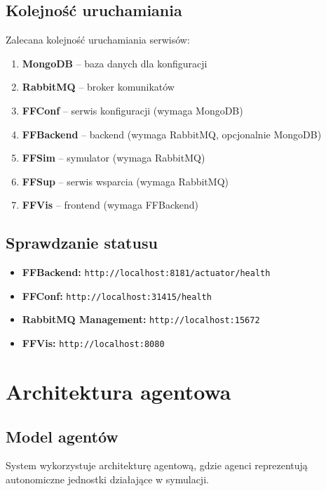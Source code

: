 \subsection{Kolejność uruchamiania}

Zalecana kolejność uruchamiania serwisów:

\begin{enumerate}
    \item \textbf{MongoDB} -- baza danych dla konfiguracji
    \item \textbf{RabbitMQ} -- broker komunikatów
    \item \textbf{FFConf} -- serwis konfiguracji (wymaga MongoDB)
    \item \textbf{FFBackend} -- backend (wymaga RabbitMQ, opcjonalnie MongoDB)
    \item \textbf{FFSim} -- symulator (wymaga RabbitMQ)
    \item \textbf{FFSup} -- serwis wsparcia (wymaga RabbitMQ)
    \item \textbf{FFVis} -- frontend (wymaga FFBackend)
\end{enumerate}

\subsection{Sprawdzanie statusu}

\begin{itemize}
    \item \textbf{FFBackend:} \texttt{http://localhost:8181/actuator/health}
    \item \textbf{FFConf:} \texttt{http://localhost:31415/health}
    \item \textbf{RabbitMQ Management:} \texttt{http://localhost:15672}
    \item \textbf{FFVis:} \texttt{http://localhost:8080}
\end{itemize}

\section{Architektura agentowa}

\subsection{Model agentów}

System wykorzystuje architekturę agentową, gdzie agenci reprezentują autonomiczne jednostki działające w symulacji.

